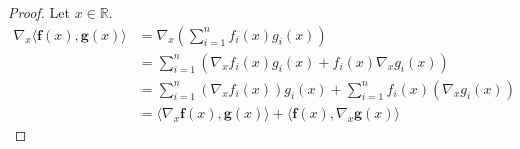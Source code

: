 \documentclass{article}
\theoremstyle{plain}
\begin{document}
\begin{proof}
	Let
	\begin{math}
		x \in \mathbb{R}.
	\end{math}
	\begin{equation*}
		\begin{split}
			\nabla_x \langle \bm{f}(x) , \bm{g}(x) \rangle &= \nabla_x \left( \sum_{i=1}^n f_i(x) g_i(x) \right) \\
			&= \sum_{i=1}^n (\nabla_x f_i(x) g_i(x) + f_i(x) \nabla_x g_i(x)) \\
			&= \sum_{i=1}^n (\nabla_x f_i(x)) g_i(x) + \sum_{i=1}^n f_i(x) (\nabla_x g_i(x)) \\
			&= \langle \nabla_x \bm{f}(x) , \bm{g}(x) \rangle + \langle \bm{f}(x) , \nabla_x \bm{g}(x) \rangle
		\end{split}
	\end{equation*}
\end{proof}
\end{document}
